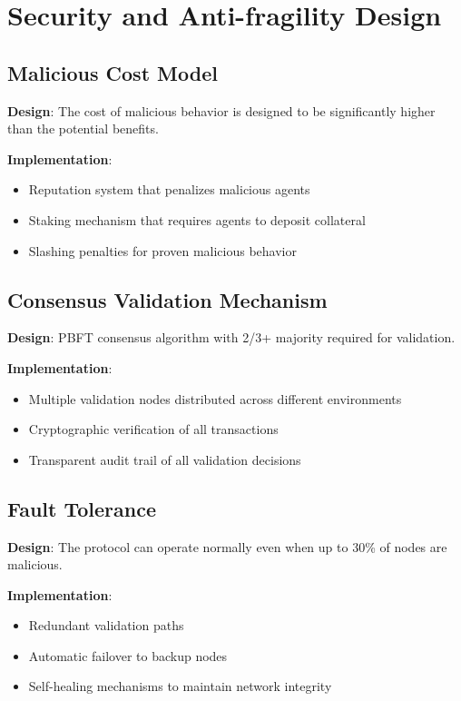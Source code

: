 \documentclass[11pt,twocolumn]{article}
\begin{document}
\section{Security and Anti-fragility Design}

\subsection{Malicious Cost Model}
\textbf{Design}: The cost of malicious behavior is designed to be significantly higher than the potential benefits.

\textbf{Implementation}:
\begin{itemize}
  \item Reputation system that penalizes malicious agents
  \item Staking mechanism that requires agents to deposit collateral
  \item Slashing penalties for proven malicious behavior
\end{itemize}

\subsection{Consensus Validation Mechanism}
\textbf{Design}: PBFT consensus algorithm with 2/3+ majority required for validation.

\textbf{Implementation}:
\begin{itemize}
  \item Multiple validation nodes distributed across different environments
  \item Cryptographic verification of all transactions
  \item Transparent audit trail of all validation decisions
\end{itemize}

\subsection{Fault Tolerance}
\textbf{Design}: The protocol can operate normally even when up to 30\% of nodes are malicious.

\textbf{Implementation}:
\begin{itemize}
  \item Redundant validation paths
  \item Automatic failover to backup nodes
  \item Self-healing mechanisms to maintain network integrity
\end{itemize}
\end{document}
